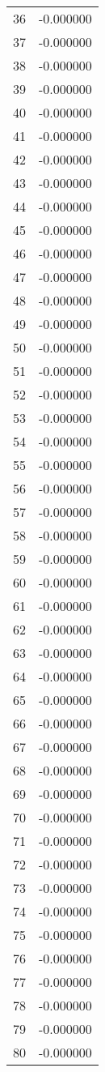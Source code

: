 \documentclass[12pt]{article}
\begin{document}
\begin{longtable}{@{}cc@{}}
36 & -0.000000 \\
37 & -0.000000 \\
38 & -0.000000 \\
39 & -0.000000 \\
40 & -0.000000 \\
41 & -0.000000 \\
42 & -0.000000 \\
43 & -0.000000 \\
44 & -0.000000 \\
45 & -0.000000 \\
46 & -0.000000 \\
47 & -0.000000 \\
48 & -0.000000 \\
49 & -0.000000 \\
50 & -0.000000 \\
51 & -0.000000 \\
52 & -0.000000 \\
53 & -0.000000 \\
54 & -0.000000 \\
55 & -0.000000 \\
56 & -0.000000 \\
57 & -0.000000 \\
58 & -0.000000 \\
59 & -0.000000 \\
60 & -0.000000 \\
61 & -0.000000 \\
62 & -0.000000 \\
63 & -0.000000 \\
64 & -0.000000 \\
65 & -0.000000 \\
66 & -0.000000 \\
67 & -0.000000 \\
68 & -0.000000 \\
69 & -0.000000 \\
70 & -0.000000 \\
71 & -0.000000 \\
72 & -0.000000 \\
73 & -0.000000 \\
74 & -0.000000 \\
75 & -0.000000 \\
76 & -0.000000 \\
77 & -0.000000 \\
78 & -0.000000 \\
79 & -0.000000 \\
80 & -0.000000 \\

\end{longtable}
\end{document}
